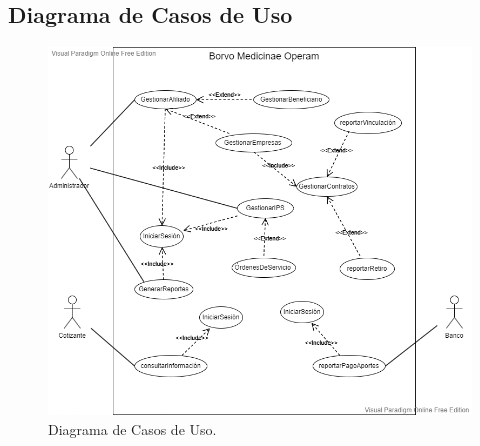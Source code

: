 \documentclass[12pt,a4paper]{article}
\begin{document}
\subsection{Diagrama de Casos de Uso}
\begin{figure}[H]
\centering
{\includegraphics[width=1 \textwidth]{use_cases_diagram.png} \par}
\caption{Diagrama de Casos de Uso.}
\end{figure}
\end{document}
